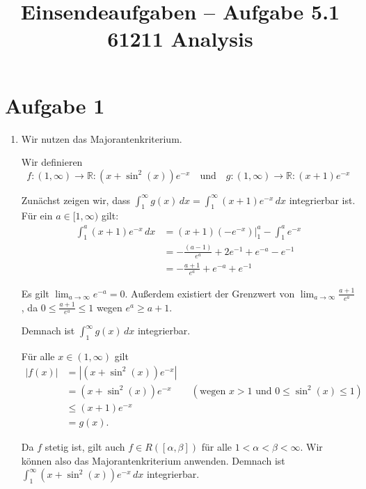 \documentclass[a4paper,12pt]{article}
\title{Einsendeaufgaben -- Aufgabe 5.1\\[0.5em]
\large 61211 Analysis}
\author{}
\date{}
\begin{document}
\maketitle

\section*{Aufgabe 1}

\begin{enumerate}[label=\alph*), start=2]

    \item
    Wir nutzen das Majorantenkriterium.

    Wir definieren
    \[
        f: (1,\infty) \to \mathbb{R} : (x+\sin^2(x))e^{-x}
        \quad\text{und}\quad
        g: (1,\infty) \to \mathbb{R} : (x+1)e^{-x}
    \]

    Zunächst zeigen wir, dass $\int_1^\infty g(x)\,dx = \int_1^\infty (x+1)e^{-x}\,dx$ integrierbar ist. Für ein $a \in [1,\infty)$ gilt:
    \begin{align*}
        \int_1^a (x+1)e^{-x}\,dx
        &= (x+1)(-e^{-x})\Big|_1^a - \int_1^a e^{-x} \\
        &= -\frac{(a-1)}{e^a} + 2e^{-1} + e^{-a} - e^{-1} \\
        &= -\frac{a+1}{e^a} + e^{-a} + e^{-1}
    \end{align*}

    Es gilt $\lim_{a\to\infty} e^{-a} = 0$. Außerdem existiert der Grenzwert von $\lim_{a\to\infty} \frac{a+1}{e^a}$, da $0 \leq \frac{a+1}{e^a} \leq 1$ wegen $e^a \geq a+1$.

    Demnach ist $\int_1^\infty g(x)\,dx$ integrierbar.

    Für alle $x \in (1,\infty)$ gilt
    \begin{align*}
        |f(x)| &= \left| (x+\sin^2(x))e^{-x} \right| \\
        &= (x+\sin^2(x))e^{-x} \qquad (\text{wegen } x>1 \text{ und } 0 \leq \sin^2(x) \leq 1) \\
        &\leq (x+1)e^{-x} \\
        &= g(x).
    \end{align*}

    Da $f$ stetig ist, gilt auch $f \in R([\alpha,\beta])$ für alle $1 < \alpha < \beta < \infty$. Wir können also das Majorantenkriterium anwenden. Demnach ist $\int_1^\infty (x+\sin^2(x))e^{-x}\,dx$ integrierbar.

\end{enumerate}
\end{document}
